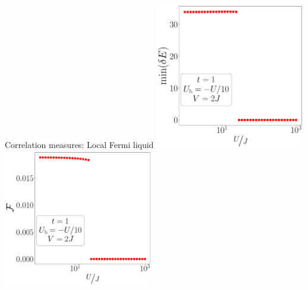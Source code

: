 \documentclass[aspectratio=169]{beamer}
\begin{document}
\begin{frame}[noframenumbering]{Correlation measures: Local Fermi liquid}
\vspace*{20pt}
\includegraphics[width=0.49\textwidth]{./figures/gap-t=1.000,J=10.000,0.000,40,V=3J,Ubath=-U_by_10,N=4,U=1.000,1000.000,40.pdf}
\includegraphics[width=0.49\textwidth]{./figures/lfl-t=1.000,J=10.000,0.000,40,V=3J,Ubath=-U_by_10,N=4,U=1.000,1000.000,40.pdf}
\end{frame}
\end{document}
